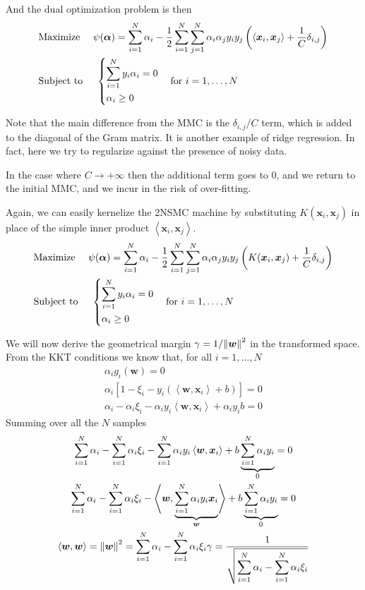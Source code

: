 \documentclass[oneside,onecolumn]{report}
\newcommand{\inp}[2]{\left\langle #1, #2 \right\rangle}
\begin{document}
And the dual optimization problem is then
\begin{align*}
    &\text{Maximize   } \quad \psi(\bm \alpha) = \sum_{i = 1}^N \alpha_i - \frac{1}{2} \sum_{i = 1}^N \sum_{j = 1}^N \alpha_i \alpha_j y_i y_j \left( \inp{\bm x_i}{\bm x_j} + \frac{1}{C} \delta_{i, j} \right) \\
    &\text{Subject to } \quad \begin{dcases}
    \sum_{i = 1}^N y_i \alpha_i = 0 \\
    \alpha_i \geq 0
\end{dcases} \quad \text{for } i = 1, \dots, N
\end{align*}

Note that the main difference from the MMC is the $\delta_{i, j}/C$ term, which is added to the diagonal of the Gram matrix.
It is another example of ridge regression.
In fact, here we try to regularize against the presence of noisy data.

In the case where $C \to +\infty$ then the additional term goes to 0, and we return to the initial MMC, and we incur in the risk of over-fitting.

Again, we can easily kernelize the 2NSMC machine by substituting $K(\bm x_i, \bm x_j)$ in place of the simple inner product $\inp{\bm x_i}{\bm x_j}$.
\begin{align*}
    &\text{Maximize   } \quad \psi(\bm \alpha) = \sum_{i = 1}^N \alpha_i - \frac{1}{2} \sum_{i = 1}^N \sum_{j = 1}^N \alpha_i \alpha_j y_i y_j \left( K(\bm x_i, \bm x_j) + \frac{1}{C} \delta_{i, j} \right) \\
    &\text{Subject to } \quad \begin{dcases}
    \sum_{i = 1}^N y_i \alpha_i = 0 \\
    \alpha_i \geq 0
\end{dcases} \quad \text{for } i = 1, \dots, N
\end{align*}

We will now derive the geometrical margin $\gamma = 1/\norm{\bm w}^2$ in the transformed space.
From the KKT conditions we know that, for all $i = 1, \dots, N$
\begin{gather*}
    \alpha_i g_i(\bm w) = 0 \\
    \alpha_i \left[ 1 - \xi_i - y_i (\inp{\bm w}{\bm x_i} + b) \right] = 0 \\
    \alpha_i - \alpha_i \xi_i - \alpha_i y_i \inp{\bm w}{\bm x_i} + \alpha_i y_i b = 0
\end{gather*}
Summing over all the $N$ samples
\begin{gather}
    \sum_{i = 1}^N \alpha_i - \sum_{i = 1}^N  \alpha_i \xi_i - \sum_{i = 1}^N  \alpha_i y_i \inp{\bm w}{\bm x_i} + b \underbrace{\sum_{i = 1}^N \alpha_i y_i}_0 = 0 \\
    \sum_{i = 1}^N \alpha_i - \sum_{i = 1}^N  \alpha_i \xi_i - \inp{\bm w}{\underbrace{\sum_{i = 1}^N \alpha_i y_i \bm x_i}_{\bm w}} + b \underbrace{\sum_{i = 1}^N \alpha_i y_i}_0 = 0 \\
    \inp{\bm w}{\bm w} = \norm{\bm w}^2 = \sum_{i = 1}^N \alpha_i - \sum_{i = 1}^N \alpha_i \xi_i
    \gamma = \frac{1}{\displaystyle \sqrt{\sum_{i = 1}^N \alpha_i - \sum_{i = 1}^N \alpha_i \xi_i}}
\end{gather}
\end{document}
